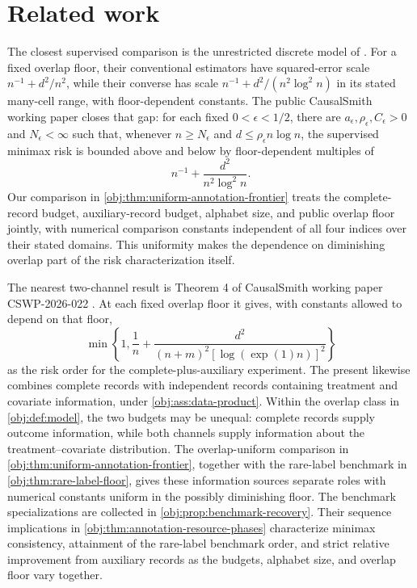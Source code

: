 \documentclass[11pt]{article}
\begin{document}
\section{Related work}

The closest supervised comparison is the unrestricted discrete model of \citet[model (3), Theorems 1--2]{ZengBalakrishnanHanKennedy2026Discrete}. For a fixed overlap floor, their conventional estimators have squared-error scale \(n^{-1}+d^2/n^2\), while their converse has scale \(n^{-1}+d^2/(n^2\log^2 n)\) in its stated many-cell range, with floor-dependent constants. The public CausalSmith working paper \citet[Theorem \texttt{thm:sharp-minimax-fixed-interior}]{InternalDiscreteATEPolynomialUpperMatch} closes that gap: for each fixed \(0<\epsilon<1/2\), there are \(a_\epsilon,\rho_\epsilon,C_\epsilon>0\) and \(N_\epsilon<\infty\) such that, whenever \(n\ge N_\epsilon\) and \(d\le\rho_\epsilon n\log n\), the supervised minimax risk is bounded above and below by floor-dependent multiples of
\[
n^{-1}+\frac{d^2}{n^2\log^2 n}.
\]
Our comparison in \cref{obj:thm:uniform-annotation-frontier} treats the complete-record budget, auxiliary-record budget, alphabet size, and public overlap floor jointly, with numerical comparison constants independent of all four indices over their stated domains. This uniformity makes the dependence on diminishing overlap part of the risk characterization itself.

The nearest two-channel result is Theorem 4 of CausalSmith working paper CSWP-2026-022 \citep{CausalSmith2026Annotation}. At each fixed overlap floor it gives, with constants allowed to depend on that floor,
\[
\min\left\{1,\frac1n+\frac{d^2}{(n+m)^2[\log(\exp(1)n)]^2}\right\}
\]
as the risk order for the complete-plus-auxiliary experiment. The present  likewise combines complete records with independent records containing treatment and covariate information, under \cref{obj:ass:data-product}. Within the overlap class in \cref{obj:def:model}, the two budgets may be unequal: complete records supply outcome information, while both channels supply information about the treatment--covariate distribution. The overlap-uniform comparison in \cref{obj:thm:uniform-annotation-frontier}, together with the rare-label benchmark in \cref{obj:thm:rare-label-floor}, gives these information sources separate roles with numerical constants uniform in the possibly diminishing floor. The benchmark specializations are collected in \cref{obj:prop:benchmark-recovery}. Their sequence implications in \cref{obj:thm:annotation-resource-phases} characterize minimax consistency, attainment of the rare-label benchmark order, and strict relative improvement from auxiliary records as the budgets, alphabet size, and overlap floor vary together.
\end{document}
